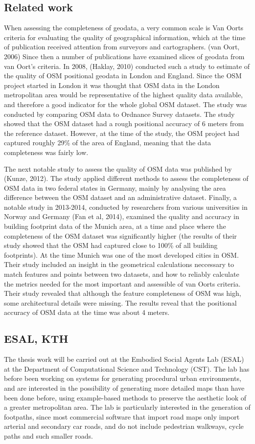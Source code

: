 \documentclass[a4paper]{article}
\begin{document}
\subsection{Related work}
When assessing the completeness of geodata, a very common scale is Van Oorts criteria for evaluating the quality of geographical information, which at the time of publication received attention from surveyors and cartographers. (van Oort, 2006) Since then a number of publications have examined slices of geodata from van Oort's criteria. In 2008, (Haklay, 2010) conducted such a study to estimate of the quality of OSM positional geodata in London and England. Since the OSM project started in London it was thought that OSM data in the London metropolitan area would be representative of the highest quality data available, and therefore a good indicator for the whole global OSM dataset. The study was conducted by comparing OSM data to Ordnance Survey datasets. The study showed that the OSM dataset had a rough positional accuracy of 6 meters from the reference dataset. However, at the time of the study, the OSM project had captured roughly 29\% of the area of England, meaning that the data completeness was fairly low.

The next notable study to assess the quality of OSM data was published by (Kunze, 2012). The study applied different methods to assess the completeness of OSM data in two federal states in Germany, mainly by analysing the area difference between the OSM dataset and an administrative dataset. Finally, a notable study in 2013-2014, conducted by researchers from various universities in Norway and Germany (Fan et al, 2014), examined the quality and accuracy in building footprint data of the Munich area, at a time and place where the completeness of the OSM dataset was significantly higher (the results of their study showed that the OSM had captured close to 100\% of all building footprints). At the time Munich was one of the most developed cities in OSM. Their study included an insight in the geometrical calculations neccessary to match features and points between two datasets, and how to reliably calculate the metrics needed for the most important and assessible of van Oorts criteria. Their study revealed that although the feature completeness of OSM was high, some architectural details were missing. The results reveal that the positional accuracy of OSM data at the time was about 4 meters.

\subsection{ESAL, KTH}
The thesis work will be carried out at the Embodied Social Agents Lab (ESAL) at the Department of Computational Science and Technology (CST). The lab has before been working on systems for generating procedural urban environments, and are interested in the possibility of generating more detailed maps than have been done before, using example-based methods to preserve the aesthetic look of a greater metropolitan area. The lab is particularly interested in the generation of footpaths, since most commercial software that import road maps only import arterial and secondary car roads, and do not include pedestrian walkways, cycle paths and such smaller roads.
\end{document}
